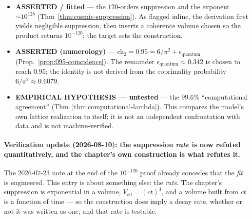 \begin{itemize}
\item \textbf{ASSERTED / fitted} --- the $120$-orders suppression and the exponent
  $\sim10^{128}$ (Thm~\ref{thm:cosmic-suppression}). As flagged inline, the
  derivation first yields negligible suppression, then inserts a coherence volume
  chosen so the product returns $10^{-120}$; the target sets the construction.
\item \textbf{ASSERTED (numerology)} --- ch$_2=0.95=6/\pi^2+\epsilon_{\text{quantum}}$
  (Prop.~\ref{prop:095-coincidence}). The remainder
  $\epsilon_{\text{quantum}}\approx0.342$ is chosen to reach $0.95$; the identity is
  not derived from the coprimality probability $6/\pi^2\approx0.6079$.
\item \textbf{EMPIRICAL HYPOTHESIS --- untested} --- the $99.6\%$ ``computational
  agreement'' (Thm~\ref{thm:computational-lambda}). This compares the model's own
  lattice realization to itself; it is not an independent confrontation with data
  and is not machine-verified.
\end{itemize}

\paragraph{Verification update (2026-08-10): the suppression \emph{rate} is now
refuted quantitatively, and the chapter's own construction is what refutes it.}
The 2026-07-23 note at the end of the $10^{-120}$ proof already concedes that the
\emph{fit} is engineered. This entry is about something else: the \emph{rate}.
The chapter's suppression is exponential in a volume, $V_{\text{eff}} = (ct)^3$,
and a volume built from $ct$ is a function of time --- so the construction does
imply a decay rate, whether or not it was written as one, and that rate is
testable.

